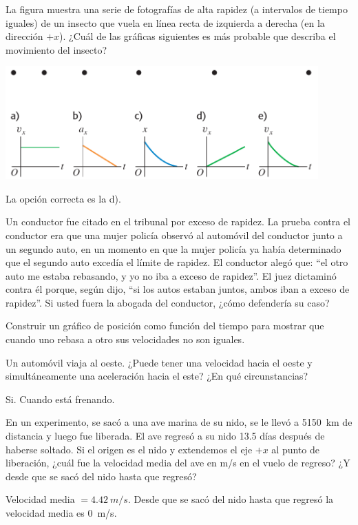 \documentclass[11pt]{article}
\begin{document}
\begin{exercise}
La figura muestra una serie de fotografías de alta rapidez (a intervalos de tiempo iguales) de un insecto que vuela en línea recta de izquierda a derecha (en la dirección $+x$). ¿Cuál de las gráficas siguientes es más probable que describa el movimiento del insecto?
\begin{center}
    \includegraphics[width=0.9\textwidth]{figs/activ-02.png}
\end{center}
\end{exercise}
\begin{solution}
    La opción correcta es la d).
\end{solution}

\begin{exercise}
Un conductor fue citado en el tribunal por exceso de rapidez. La prueba contra el conductor era que una mujer policía observó al automóvil del conductor junto a un segundo auto, en un momento en que la mujer policía ya había determinado que el segundo auto excedía el límite de rapidez. El conductor alegó que: “el otro auto me estaba rebasando, y yo no iba a exceso de rapidez”. El juez dictaminó contra él porque, según dijo, “si los autos estaban juntos, ambos iban a exceso de rapidez”. Si usted fuera la abogada del conductor, ¿cómo defendería su caso?
\end{exercise}
\begin{solution}
Construir un gráfico de posición como función del tiempo para mostrar que cuando uno
rebasa a otro sus velocidades no son iguales.
\end{solution}

\begin{exercise}
Un automóvil viaja al oeste. ¿Puede tener una velocidad hacia el oeste y simultáneamente una aceleración hacia el este? ¿En qué circunstancias?
\end{exercise}
\begin{solution}
    Si. Cuando está frenando.
\end{solution}

\begin{exercise}
    En un experimento, se sacó a una ave marina de su nido, se le llevó a \qty{5150}{km} de distancia y luego fue liberada. El ave regresó a su nido \num{13.5} días después de haberse soltado. Si el origen es el nido y extendemos el eje $+x$ al punto de liberación, ¿cuál fue la velocidad media del ave en \unit{m/s} en el vuelo de regreso? ¿Y desde que se sacó del nido hasta que regresó?
\end{exercise}
\begin{solution}
    Velocidad media $= \qty{4.42}{m/s}$. Desde que se sacó del nido hasta que regresó la velocidad media es \qty{0}{m/s}.
\end{solution}
\end{document}
